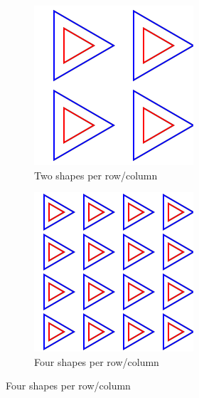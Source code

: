 \documentclass[a4paper, oneside]{discothesis}
\begin{document}
\begin{figure}[th]
	\begin{subfigure}[t]{0.19\textwidth}\centering\includegraphics[width=\linewidth]{figures/3_2_2_True.png}\caption{Two shapes per row/column}\label{fig:atk5}\end{subfigure}
	\hfill
	\begin{subfigure}[t]{0.19\textwidth}\centering\includegraphics[width=\linewidth]{figures/3_4_2_True.png}\caption{Four shapes per row/column}\label{fig:atk6}\end{subfigure}

\end{figure}
\end{document}
